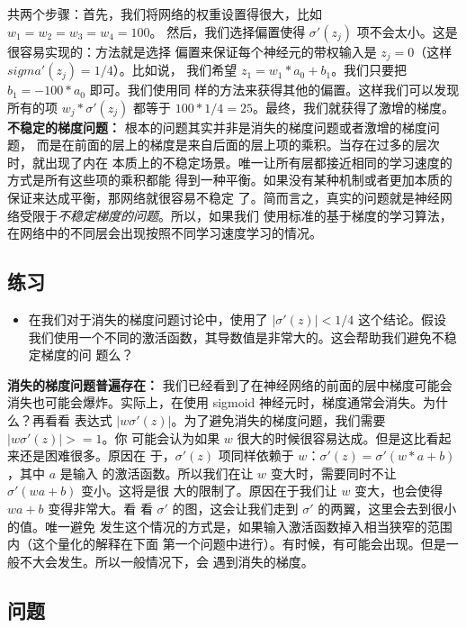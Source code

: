 共两个步骤：首先，我们将网络的权重设置得很大，比如 $w_1 = w_2 = w_3 = w_4 = 100$。
然后，我们选择偏置使得 $\sigma'(z_j)$ 项不会太小。这是很容易实现的：方法就是选择
偏置来保证每个神经元的带权输入是 $z_j = 0$（这样 $sigma'(z_j) = 1/4$）。比如说，
我们希望 $z_1 = w_1 * a_0 + b_1$。我们只要把 $b_1 = -100 * a_0$ 即可。我们使用同
样的方法来获得其他的偏置。这样我们可以发现所有的项 $w_j * \sigma'(z_j)$ 都等于
$100*1/4 = 25$。最终，我们就获得了激增的梯度。\\
 
\textbf{不稳定的梯度问题：} 根本的问题其实并非是消失的梯度问题或者激增的梯度问题，
而是在前面的层上的梯度是来自后面的层上项的乘积。当存在过多的层次时，就出现了内在
本质上的不稳定场景。唯一让所有层都接近相同的学习速度的方式是所有这些项的乘积都能
得到一种平衡。如果没有某种机制或者更加本质的保证来达成平衡，那网络就很容易不稳定
了。简而言之，真实的问题就是神经网络受限于\emph{不稳定梯度的问题}。所以，如果我们
使用标准的基于梯度的学习算法，在网络中的不同层会出现按照不同学习速度学习的情况。

\subsection*{练习}

\begin{itemize}
\item 在我们对于消失的梯度问题讨论中，使用了 $|\sigma'(z)| < 1/4$ 这个结论。假设
  我们使用一个不同的激活函数，其导数值是非常大的。这会帮助我们避免不稳定梯度的问
  题么？
\end{itemize}
 
\textbf{消失的梯度问题普遍存在：} 我们已经看到了在神经网络的前面的层中梯度可能会
消失也可能会爆炸。实际上，在使用 sigmoid 神经元时，梯度通常会消失。为什么？再看看
表达式 $|w\sigma'(z)|$。为了避免消失的梯度问题，我们需要 $|w\sigma'(z)| >= 1$。你
可能会认为如果 $w$ 很大的时候很容易达成。但是这比看起来还是困难很多。原因在
于，$\sigma'(z)$ 项同样依赖于 $w$：$\sigma'(z) = \sigma'(w*a+b)$，其中 $a$ 是输入
的激活函数。所以我们在让 $w$ 变大时，需要同时不让 $\sigma'(wa+b)$ 变小。这将是很
大的限制了。原因在于我们让 $w$ 变大，也会使得 $wa + b$ 变得非常大。看
看 $\sigma'$ 的图，这会让我们走到 $\sigma'$ 的两翼，这里会去到很小的值。唯一避免
发生这个情况的方式是，如果输入激活函数掉入相当狭窄的范围内（这个量化的解释在下面
第一个问题中进行）。有时候，有可能会出现。但是一般不大会发生。所以一般情况下，会
遇到消失的梯度。

\subsection*{问题}

